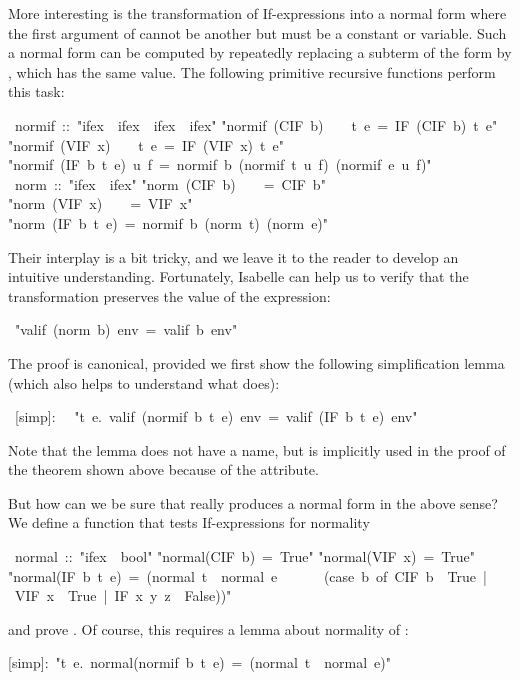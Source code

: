 \begin{isabelle}
\begin{isamarkuptext}
More interesting is the transformation of If-expressions into a normal form
where the first argument of  cannot be another  but
must be a constant or variable. Such a normal form can be computed by
repeatedly replacing a subterm of the form  by
, which has the same value. The following
primitive recursive functions perform this task:%
\end{isamarkuptext}%
\ normif\ ::\ {"}ifex\ {\isasymRightarrow}\ ifex\ {\isasymRightarrow}\ ifex\ {\isasymRightarrow}\ ifex{"}\isanewline
{}\isanewline
{"}normif\ (CIF\ b)\ \ \ \ t\ e\ =\ IF\ (CIF\ b)\ t\ e{"}\isanewline
{"}normif\ (VIF\ x)\ \ \ \ t\ e\ =\ IF\ (VIF\ x)\ t\ e{"}\isanewline
{"}normif\ (IF\ b\ t\ e)\ u\ f\ =\ normif\ b\ (normif\ t\ u\ f)\ (normif\ e\ u\ f){"}\isanewline
\isanewline
{}\ norm\ ::\ {"}ifex\ {\isasymRightarrow}\ ifex{"}\isanewline
{}\isanewline
{"}norm\ (CIF\ b)\ \ \ \ =\ CIF\ b{"}\isanewline
{"}norm\ (VIF\ x)\ \ \ \ =\ VIF\ x{"}\isanewline
{"}norm\ (IF\ b\ t\ e)\ =\ normif\ b\ (norm\ t)\ (norm\ e){"}%
\begin{isamarkuptext}%
\noindent
Their interplay is a bit tricky, and we leave it to the reader to develop an
intuitive understanding. Fortunately, Isabelle can help us to verify that the
transformation preserves the value of the expression:%
\end{isamarkuptext}%
\ {"}valif\ (norm\ b)\ env\ =\ valif\ b\ env{"}%
\begin{isamarkuptext}%
\noindent
The proof is canonical, provided we first show the following simplification
lemma (which also helps to understand what  does):%
\end{isamarkuptext}%
\ [simp]:\isanewline
\ \ {"}{\isasymforall}t\ e.\ valif\ (normif\ b\ t\ e)\ env\ =\ valif\ (IF\ b\ t\ e)\ env{"}%
\begin{isamarkuptext}%
\noindent
Note that the lemma does not have a name, but is implicitly used in the proof
of the theorem shown above because of the \isa{[simp]} attribute.

But how can we be sure that  really produces a normal form in
the above sense? We define a function that tests If-expressions for normality%
\end{isamarkuptext}%
\ normal\ ::\ {"}ifex\ {\isasymRightarrow}\ bool{"}\isanewline
{}\isanewline
{"}normal(CIF\ b)\ =\ True{"}\isanewline
{"}normal(VIF\ x)\ =\ True{"}\isanewline
{"}normal(IF\ b\ t\ e)\ =\ (normal\ t\ {\isasymand}\ normal\ e\ {\isasymand}\isanewline
\ \ \ \ \ (case\ b\ of\ CIF\ b\ {\isasymRightarrow}\ True\ |\ VIF\ x\ {\isasymRightarrow}\ True\ |\ IF\ x\ y\ z\ {\isasymRightarrow}\ False)){"}%
\begin{isamarkuptext}%
\noindent
and prove . Of course, this requires a lemma about
normality of :%
\end{isamarkuptext}%
[simp]:\ {"}{\isasymforall}t\ e.\ normal(normif\ b\ t\ e)\ =\ (normal\ t\ {\isasymand}\ normal\ e){"}\end{isabelle}%
